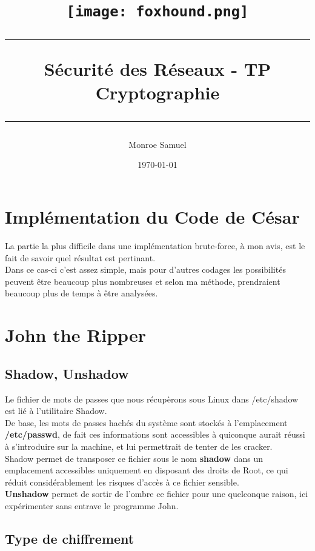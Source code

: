 \documentclass[a4paper,10pt,final,fleqn]{article}
\title{
\parbox{15cm}
{ \texttt{[image: foxhound.png]} \\
  \vspace{3cm}
	\begin{center}\sf\bfseries\Huge
		\rule{15cm}{1pt}
		\medskip
		Sécurité des Réseaux - TP \\
		\huge Cryptographie
		\vspace{.5cm}
		\rule{15cm}{1pt}
	\end{center}
	\vspace{3cm}
 }}
\author{Monroe Samuel}
\date{\today}
\begin{document}
\maketitle
\newpage

	\section{Implémentation du Code de César}

			La partie la plus difficile dans une implémentation brute-force, à mon avis, est le fait de savoir quel résultat est pertinant.\\
			Dans ce cas-ci c'est assez simple, mais pour d'autres codages les possibilités peuvent être beaucoup plus nombreuses et selon ma méthode, prendraient beaucoup plus de temps à être analysées.\\

			


	\section{John the Ripper}

		\subsection{Shadow, Unshadow}

			Le fichier de mots de passes que nous récupèrons sous Linux dans /etc/shadow est lié à l'utilitaire Shadow.\\

			De base, les mots de passes hachés du système sont stockés à l'emplacement \textbf{/etc/passwd}, de fait ces informations
			sont accessibles à quiconque aurait réussi à s'introduire sur la machine, et lui permettrait de tenter de les cracker.\\

			Shadow permet de transposer ce fichier sous le nom \textbf{shadow} dans un emplacement accessibles uniquement en disposant des droits
			de Root, ce qui réduit considérablement les risques d'accès à ce fichier sensible.\\
			\textbf{Unshadow} permet de sortir de l'ombre ce fichier pour une quelconque raison, ici expérimenter sans entrave le programme John.\\

		\subsection{Type de chiffrement}
\end{document}
